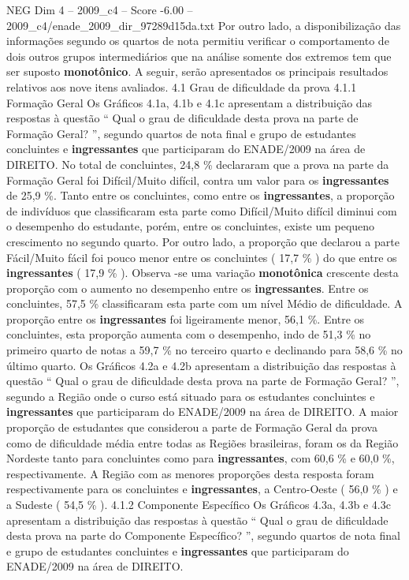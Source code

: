 \begin{textsample}{NEG Dim 4 – 2009\_c4 – Score -6.00 – 2009\_c4/enade\_2009\_dir\_97289d15da.txt}
Por outro lado, a disponibilização das informações segundo os quartos de nota permitiu verificar o comportamento de dois outros grupos intermediários que na análise somente dos extremos tem que ser suposto \textbf{monotônico}.
A seguir, serão apresentados os principais resultados relativos aos nove itens avaliados. 4.1 Grau de dificuldade da prova 4.1.1 Formação Geral Os Gráficos 4.1a, 4.1b e 4.1c apresentam a distribuição das respostas à questão “ Qual o grau de dificuldade desta prova na parte de Formação Geral? ”, segundo quartos de nota final e grupo de estudantes concluintes e \textbf{ingressantes} que participaram do ENADE/2009 na área de DIREITO.
No total de concluintes, 24,8 \% declararam que a prova na parte da Formação Geral foi Difícil/Muito difícil, contra um valor para os \textbf{ingressantes} de 25,9 \%.
Tanto entre os concluintes, como entre os \textbf{ingressantes}, a proporção de indivíduos que classificaram esta parte como Difícil/Muito difícil diminui com o desempenho do estudante, porém, entre os concluintes, existe um pequeno crescimento no segundo quarto.
Por outro lado, a proporção que declarou a parte Fácil/Muito fácil foi pouco menor entre os concluintes ( 17,7 \% ) do que entre os \textbf{ingressantes} ( 17,9 \% ).
Observa -se uma variação \textbf{monotônica} crescente desta proporção com o aumento no desempenho entre os \textbf{ingressantes}.
Entre os concluintes, 57,5 \% classificaram esta parte com um nível Médio de dificuldade.
A proporção entre os \textbf{ingressantes} foi ligeiramente menor, 56,1 \%.
Entre os concluintes, esta proporção aumenta com o desempenho, indo de 51,3 \% no primeiro quarto de notas a 59,7 \% no terceiro quarto e declinando para 58,6 \% no último quarto.
Os Gráficos 4.2a e 4.2b apresentam a distribuição das respostas à questão “ Qual o grau de dificuldade desta prova na parte de Formação Geral? ”, segundo a Região onde o curso está situado para os estudantes concluintes e \textbf{ingressantes} que participaram do ENADE/2009 na área de DIREITO.
A maior proporção de estudantes que considerou a parte de Formação Geral da prova como de dificuldade média entre todas as Regiões brasileiras, foram os da Região Nordeste tanto para concluintes como para \textbf{ingressantes}, com 60,6 \% e 60,0 \%, respectivamente.
A Região com as menores proporções desta resposta foram respectivamente para os concluintes e \textbf{ingressantes}, a Centro-Oeste ( 56,0 \% ) e a Sudeste ( 54,5 \% ). 4.1.2 Componente Específico Os Gráficos 4.3a, 4.3b e 4.3c apresentam a distribuição das respostas à questão “ Qual o grau de dificuldade desta prova na parte do Componente Específico? ”, segundo quartos de nota final e grupo de estudantes concluintes e \textbf{ingressantes} que participaram do ENADE/2009 na área de DIREITO.

\end{textsample}
